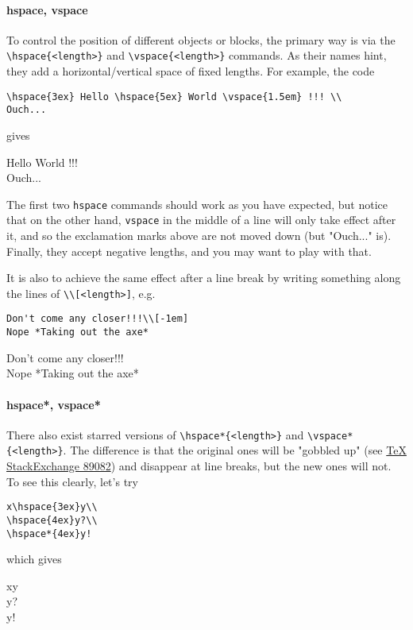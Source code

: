 \paragraph{hspace, vspace}
To control the position of different objects or blocks, the primary way is via the \texttt{\textbackslash hspace\{<length>\}} and \texttt{\textbackslash vspace\{<length>\}} commands. As their names hint, they add a horizontal/vertical space of fixed lengths. For example, the code
\begin{lstlisting}
\hspace{3ex} Hello \hspace{5ex} World \vspace{1.5em} !!! \\
Ouch...
\end{lstlisting}
gives \par
\hspace{3ex} Hello \hspace{5ex} World \vspace{1.5em} !!! \\
Ouch...\par
The first two \texttt{\text hspace} commands should work as you have expected, but notice that on the other hand, \texttt{\text vspace} in the middle of a line will only take effect after it, and so the exclamation marks above are not moved down (but "Ouch..." is). Finally, they accept negative lengths, and you may want to play with that.\par

It is also to achieve the same effect after a line break by writing something along the lines of \texttt{\textbackslash\textbackslash [<length>]}, e.g.\
\begin{lstlisting}
Don't come any closer!!!\\[-1em]
Nope *Taking out the axe*
\end{lstlisting}
Don't come any closer!!!\\[-1em]
Nope *Taking out the axe*

\paragraph{hspace*, vspace*}
There also exist starred versions of \texttt{\textbackslash hspace*\{<length>\}} and \texttt{\textbackslash vspace*\{<length>\}}. The difference is that the original ones will be "gobbled up" (see \href{https://tex.stackexchange.com/questions/89082/hspace-vs-hspace}{{\TeX{} StackExchange 89082}}) and disappear at line breaks, but the new ones will not. To see this clearly, let's try
\begin{lstlisting}
x\hspace{3ex}y\\
\hspace{4ex}y?\\
\hspace*{4ex}y!
\end{lstlisting}
which gives \par
x\hspace{3ex}y\\
\hspace{4ex}y?\\
\hspace*{4ex}y!

